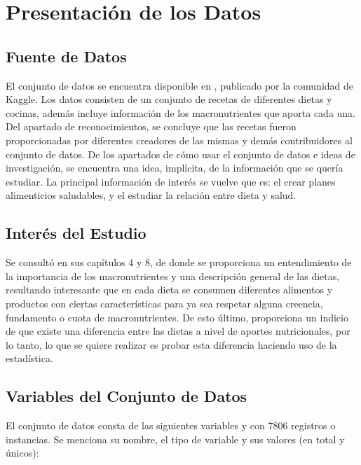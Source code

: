 \documentclass[12pt,a4paper]{article}
\begin{document}
    \newpage
 
    \newpage

    \section{Presentación de los Datos}
    {
        \subsection{Fuente de Datos}
        {
            El conjunto de datos se encuentra disponible en \cite{dataset_macronutrients}, 
            publicado por la comunidad de Kaggle. Los datos consisten de un conjunto 
            de recetas de diferentes dietas y cocinas, además incluye información de los macronutrientes que 
            aporta cada una.\\
            
            \cite{dataset_macronutrients} Del apartado de reconocimientos, se concluye que las recetas fueron 
            proporcionadas por diferentes creadores de las mismas y demás contribuidores 
            al conjunto de datos. 
            De los apartados de cómo usar el conjunto de datos e ideas de investigación, 
            se encuentra una idea, implícita, de la información que se quería estudiar. 
            La principal información de interés se vuelve que es: el crear planes 
            alimenticios saludables, y el estudiar la relación entre dieta y salud.
        }

        \subsection{Interés del Estudio}
        {
            Se consultó \cite{marvastipopular} en sus 
            capítulos 4 y 8, de donde se proporciona un entendimiento de la 
            importancia de los macronutrientes y una descripción general de las 
            dietas, resultando interesante que en cada dieta se 
            consumen diferentes alimentos y productos con ciertas características 
            para ya sea respetar alguna creencia, fundamento o cuota de macronutrientes. 
            De esto último, proporciona un indicio de que existe una diferencia entre 
            las dietas a nivel de aportes nutricionales, por lo tanto, lo que se 
            quiere realizar es probar esta diferencia haciendo 
            uso de la estadística.
        }

        \subsection{Variables del Conjunto de Datos}
        {
            El conjunto de datos consta de las siguientes variables y con $7806$ registros o instancias. Se menciona su 
            nombre, el tipo de variable y sus valores (en total y únicos):
            
}}
\end{document}
